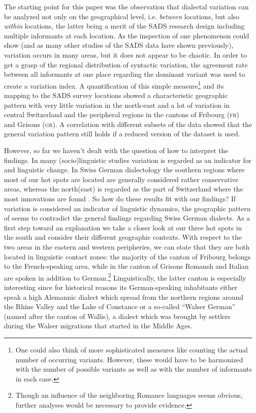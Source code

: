 \documentclass[output=paper]{LSP/langsci}
\begin{document}
The starting point for this paper was the observation that dialectal variation can be analyzed not only on the geographical level, i.e. \emph{between} locations, but also \emph{within} locations, the latter being a merit of the SADS research design including multiple informants at each location. As the inspection of one phenomenon could show (and as many other studies of the SADS data have shown previously), variation occurs in many areas, but it does not appear to be chaotic. In order to get a grasp of the regional distribution of syntactic variation, the agreement rate between all informants at one place regarding the dominant variant was used to create a variation index. A quantification of this simple measure\footnote{ One could also think of more sophisticated measures like counting the actual number of occurring variants. However, these would have to be harmonized with the number of possible variants as well as with the number of informants in each case.} and its mapping to the SADS survey locations showed a characteristic geographic pattern with very little variation in the north-east and a lot of variation in central Switzerland and the peripheral regions in the cantons of Fribourg (\textsc{fr}) and Grisons (\textsc{gr}). A correlation with different subsets of the data showed that the general variation pattern still holds if a reduced version of the dataset is used.

However, so far we haven’t dealt with the question of how to interpret the findings. In many (socio)linguistic studies variation is regarded as an indicator for  and linguistic change. In Swiss German dialectology the southern regions where most of our hot spots are located are generally considered rather conservative areas, whereas the north(east) is regarded as the part of Switzerland where the most innovations are found \citep{haas_deutschsprachige_2000}. So how do these results fit with our findings? If variation is considered an indicator of linguistic dynamics, the geographic pattern of  seems to contradict the general findings regarding Swiss German dialects. As a first step toward an explanation we take a closer look at our three hot spots in the south and consider their different geographic contexts. With respect to the two areas in the eastern and western peripheries, we can state that they are both located in linguistic contact zones: the majority of the canton of Fribourg belongs to the French-speaking area, while in the canton of Grisons Romansh and Italian are spoken in addition to German.\footnote{ Though an influence of the neighboring Romance languages seems obvious, further analyses would be necessary to provide evidence.} Linguistically, the latter canton is especially interesting since for historical reasons its German-speaking inhabitants either speak a high Alemannic dialect which spread from the northern regions around the Rhine Valley and the Lake of Constance or a so-called “Walser German” (named after the canton of Wallis), a dialect which was brought by settlers during the Walser migrations that started in the Middle Ages.
\end{document}

